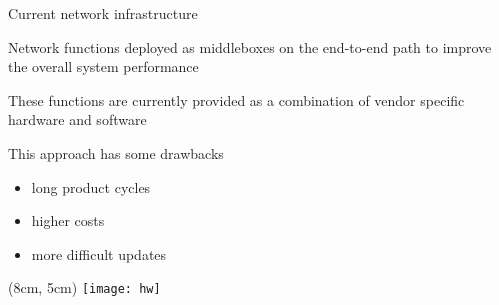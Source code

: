 \begin{frame}{Current network infrastructure}

  \vfill{}

  Network functions deployed as middleboxes on the end-to-end path to improve
  the overall system performance

  \vfill{}

  These functions are currently provided as a combination of vendor specific
  hardware and software

  \vfill{}

  This approach has some drawbacks
  \begin{itemize}
    \item long product cycles
    \item higher costs
    \item more difficult updates
  \end{itemize}

  \vfill{}

  \begin{textblock*}{1cm}(8cm, 5cm)
    \texttt{[image: hw]}
  \end{textblock*}

\end{frame}